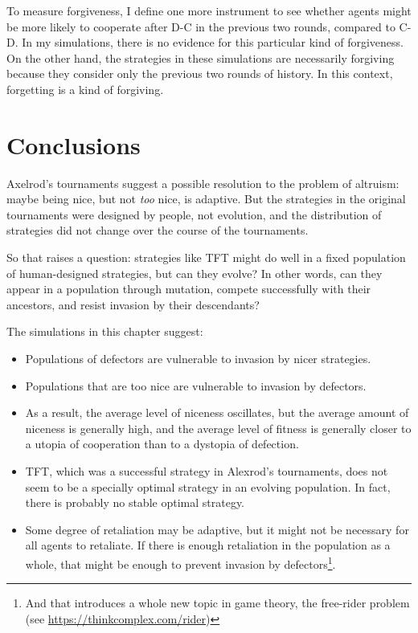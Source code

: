 \documentclass[12pt]{book}
\theoremstyle{exercise}
\begin{document}

To measure forgiveness, I define one more instrument to see whether agents might be more likely to cooperate after D-C in the previous two rounds, compared to C-D.  In my simulations, there is no evidence for this particular kind of forgiveness.  On the other hand, the strategies in these simulations are necessarily forgiving because they consider only the previous two rounds of history.  In this context, forgetting is a kind of forgiving.


\section{Conclusions}

Axelrod's tournaments suggest a possible resolution to the problem of altruism: maybe being nice, but not {\em too} nice, is adaptive.  But the strategies in the original tournaments were designed by people, not evolution, and the distribution of strategies did not change over the course of the tournaments.

So that raises a question: strategies like TFT might do well in a fixed population of human-designed strategies, but can they evolve?  In other words, can they appear in a population through mutation, compete successfully with their ancestors, and resist invasion by their descendants?

The simulations in this chapter suggest:

\begin{itemize}

\item Populations of defectors are vulnerable to invasion by nicer strategies.

\item Populations that are too nice are vulnerable to invasion by defectors.

\item As a result, the average level of niceness oscillates, but the average amount of niceness is generally high, and the average level of fitness is generally closer to a utopia of cooperation than to a dystopia of defection.

\item TFT, which was a successful strategy in Alexrod's tournaments, does not seem to be a specially optimal strategy in an evolving population.  In fact, there is probably no stable optimal strategy.

\item Some degree of retaliation may be adaptive, but it might not be
necessary for all agents to retaliate.  If there is enough retaliation in the population as a whole, that might be enough to prevent invasion by defectors\footnote{And that introduces a whole new topic in game theory, the free-rider problem (see \url{https://thinkcomplex.com/rider})}.

\end{itemize}
\end{document}

